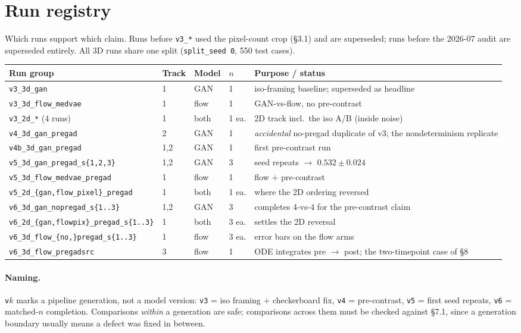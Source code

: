 \documentclass[11pt]{article}
\newcommand{\1}{\mathbb{1}}
\begin{document}
\appendix
\section{Run registry}

Which runs support which claim. Runs before \texttt{v3\_*} used the pixel-count crop
(\S3.1) and are superseded; runs before the 2026-07 audit are superseded entirely.
All 3D runs share one split (\texttt{split\_seed 0}, 550 test cases).

\begin{center}
\small
\begin{tabular}{p{4.5cm}p{1.1cm}p{1.4cm}p{1.0cm}p{5.0cm}}
\toprule
Run group & Track & Model & $n$ & Purpose / status \\
\midrule
\texttt{v3\_3d\_gan} & 1 & GAN & 1 & iso-framing baseline; superseded as headline \\
\texttt{v3\_3d\_flow\_medvae} & 1 & flow & 1 & GAN-vs-flow, no pre-contrast \\
\texttt{v3\_2d\_*} (4 runs) & 1 & both & 1 ea. & 2D track incl.\ the iso A/B (inside noise) \\
\midrule
\texttt{v4\_3d\_gan\_pregad} & 2 & GAN & 1 & \emph{accidental} no-pregad duplicate of v3; the nondeterminism replicate \\
\texttt{v4b\_3d\_gan\_pregad} & 1,2 & GAN & 1 & first pre-contrast run \\
\texttt{v5\_3d\_gan\_pregad\_s\{1,2,3\}} & 1,2 & GAN & 3 & seed repeats $\to$ $0.532\pm0.024$ \\
\texttt{v5\_3d\_flow\_medvae\_pregad} & 1 & flow & 1 & flow $+$ pre-contrast \\
\texttt{v5\_2d\_\{gan,flow\_pixel\}\_pregad} & 1 & both & 1 ea. & where the 2D ordering reversed \\
\midrule
\texttt{v6\_3d\_gan\_nopregad\_s\{1..3\}} & 1,2 & GAN & 3 & completes 4-vs-4 for the pre-contrast claim \\
\texttt{v6\_2d\_\{gan,flowpix\}\_pregad\_s\{1..3\}} & 1 & both & 3 ea. & settles the 2D reversal \\
\texttt{v6\_3d\_flow\_\{no,\}pregad\_s\{1..3\}} & 1 & flow & 3 ea. & error bars on the flow arms \\
\texttt{v6\_3d\_flow\_pregadsrc} & 3 & flow & 1 & ODE integrates pre $\to$ post; the two-timepoint case of \S8 \\
\bottomrule
\end{tabular}
\end{center}

\paragraph{Naming.} \texttt{v}$k$ marks a pipeline generation, not a model version:
\texttt{v3} = iso framing $+$ checkerboard fix, \texttt{v4} = pre-contrast, \texttt{v5} =
first seed repeats, \texttt{v6} = matched-$n$ completion. Comparisons \emph{within} a
generation are safe; comparisons across them must be checked against \S7.1, since a
generation boundary usually means a defect was fixed in between.
\end{document}
